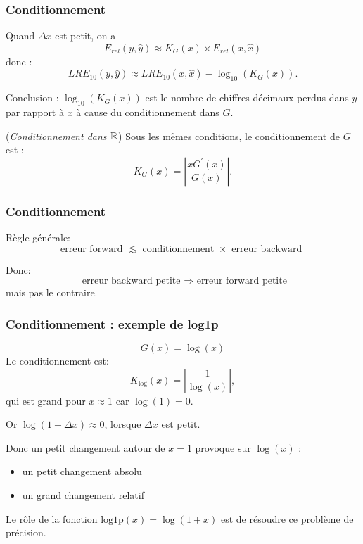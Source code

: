 \documentclass{beamer}
\begin{document}

\begin{frame}
\frametitle{Conditionnement}

Quand $\Delta x$ est petit, on a 
$$
E_{rel}(y,\hat{y}) \approx K_G(x) \times E_{rel}(x,\hat{x})
$$
donc :
$$
LRE_{10}(y,\hat{y})
\approx LRE_{10}(x,\hat{x}) - \log_{10}(K_G(x)).
$$

Conclusion : $\log_{10}(K_G(x))$ est le nombre 
de chiffres décimaux perdus dans $y$ par rapport à $x$ à cause du 
conditionnement dans $G$.

\begin{theorem}
(\emph{Conditionnement dans $\mathbb{R}$})
Sous les mêmes conditions, le conditionnement de $G$ est :
$$
K_G(x)=\left| \frac{x G^\prime(x)}{G(x)}\right|.
$$
\end{theorem}

\end{frame}


\begin{frame}
\frametitle{Conditionnement}

Règle générale:
$$
\textrm{erreur forward } \lesssim \textrm{ conditionnement } \times  
\textrm{ erreur backward } 
$$

Donc:
$$
\textrm{ erreur backward petite } \Rightarrow \textrm{ erreur forward petite}
$$
mais pas le contraire.
\end{frame}


\begin{frame}
\frametitle{Conditionnement : exemple de log1p}

\begin{example}

$$
G(x)=\log(x)
$$
Le conditionnement est:
$$
K_{\log}(x)=\left|\frac{1}{\log(x)}\right|,
$$
qui est grand pour $x\approx 1$ car $\log(1)=0$. 

Or $\log(1+\Delta x) \approx 0$, lorsque $\Delta x$ est petit. 

Donc un petit changement autour de $x=1$ provoque sur $\log(x)$ :
\begin{itemize}
\item un petit changement absolu
\item un grand changement relatif
\end{itemize}

Le rôle de la fonction $\textrm{log1p}(x)=\log(1+x)$ est 
de résoudre ce problème de précision.
\end{example}

\end{frame}
\end{document}
